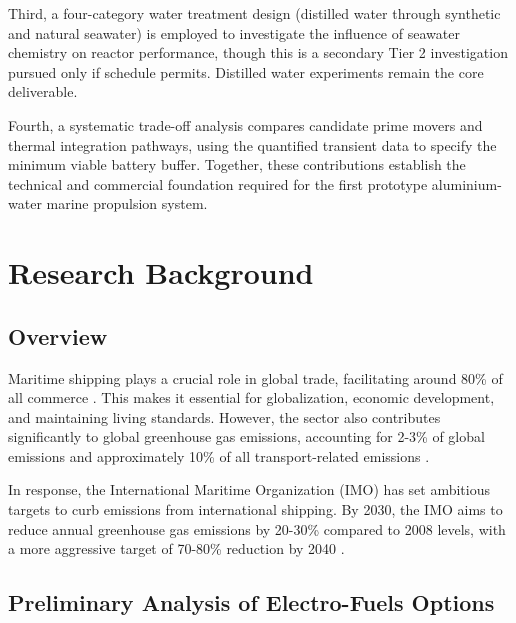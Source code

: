 \documentclass[12pt]{article}
\begin{document}
Third, a four-category water treatment design (distilled water through synthetic and natural seawater) is employed to investigate the influence of seawater chemistry on reactor performance, though this is a secondary Tier 2 investigation pursued only if schedule permits. Distilled water experiments remain the core deliverable.

Fourth, a systematic trade-off analysis compares candidate prime movers and thermal integration pathways, using the quantified transient data to specify the minimum viable battery buffer. Together, these contributions establish the technical and commercial foundation required for the first prototype aluminium-water marine propulsion system.

\break

\tableofcontents

\break

\listoftables

\listoffigures

\break

\section{Research Background}

\subsection*{Overview}

Maritime shipping plays a crucial role in global trade, facilitating around 80\% of all commerce \cite{owid-co2-emissions-from-transport}. This makes it essential for globalization, economic development, and maintaining living standards. However, the sector also contributes significantly to global greenhouse gas emissions, accounting for 2-3\% of global emissions and approximately 10\% of all transport-related emissions \cite{owid-ghg-emissions-by-sector, owid-co2-emissions-from-transport}.

In response, the International Maritime Organization (IMO) has set ambitious targets to curb emissions from international shipping. By 2030, the IMO aims to reduce annual greenhouse gas emissions by 20-30\% compared to 2008 levels, with a more aggressive target of 70-80\% reduction by 2040 \cite{imo-target}.

\subsection{Preliminary Analysis of Electro-Fuels Options}
\end{document}
